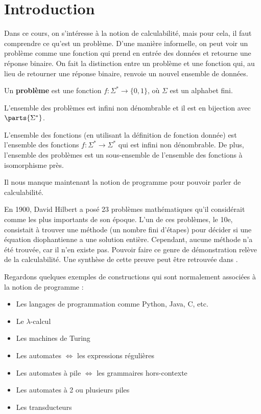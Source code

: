 \section{Introduction}


Dans ce cours, on s'intéresse à la notion de calculabilité, mais pour cela, il faut comprendre ce qu'est un problème.
D'une manière informelle, on peut voir un problème comme une fonction qui prend en entrée des données et retourne une réponse binaire.
On fait la distinction entre un problème et une fonction qui, au lieu de retourner une réponse binaire, renvoie un nouvel ensemble de données.
\begin{definition}
	Un \textbf{problème} est une fonction $f: \Sigma^* \to \{0, 1\}$, où $\Sigma$ est un alphabet fini.
\end{definition}

\begin{remarque}
	L'ensemble des problèmes est infini non dénombrable et il est en bijection avec $\parts {\Sigma^*}$.
\end{remarque}

\begin{remarque}
	L'ensemble des fonctions (en utilisant la définition de fonction donnée) est l'ensemble des fonctions $f: \Sigma^* \to \Sigma^*$ qui est infini non dénombrable.
	De plus, l'ensemble des problèmes est un sous-ensemble de l'ensemble des fonctions à isomorphisme près.
\end{remarque}

Il nous manque maintenant la notion de programme pour pouvoir parler de calculabilité.

En 1900, David Hilbert a posé 23 problèmes mathématiques qu'il considérait comme les plus importants de son époque. L'un de ces problèmes, le 10e, consistait à trouver
une méthode (un nombre fini d'étapes) pour décider si une équation diophantienne a une solution entière. Cependant, aucune méthode n'a été trouvée, car il n'en existe pas.
Pouvoir faire ce genre de démonstration relève de la calculabilité. Une synthèse de cette preuve peut être retrouvée dans \cite{Hilbert10}.

Regardons quelques exemples de constructions qui sont normalement associées à la notion de programme :

\begin{itemize}
	\item Les langages de programmation comme Python, Java, C, etc. 
	\item Le $\lambda$-calcul 
	\item Les machines de Turing 
	\item Les automates $\iff$ les expressions régulières 
	\item Les automates à pile $\iff$ les grammaires hors-contexte 
	\item Les automates à 2 ou plusieurs piles 
	\item Les transducteurs
\end{itemize}

